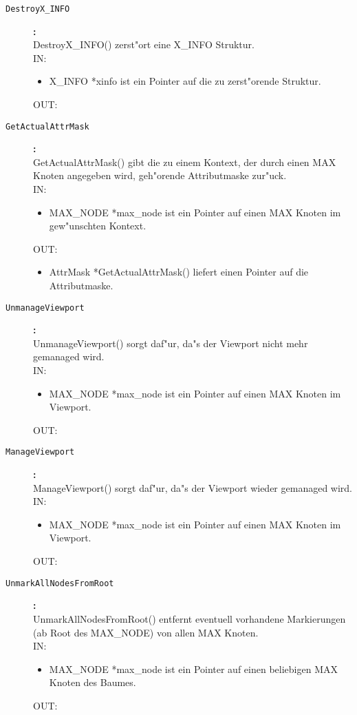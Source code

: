 \begin{description}
\item[\tt DestroyX\_INFO]{\bf :\\}
DestroyX\_INFO() zerst"ort eine X\_INFO Struktur. \\
IN:
\begin{itemize}
   \item X\_INFO *xinfo ist ein Pointer auf die zu zerst"orende Struktur.
\end{itemize}
OUT:

\item[\tt GetActualAttrMask]{\bf :\\}
GetActualAttrMask() gibt die zu einem Kontext, der durch einen MAX Knoten angegeben wird, geh"orende Attributmaske zur"uck. \\
IN:
\begin{itemize}
   \item MAX\_NODE *max\_node ist ein Pointer auf einen MAX Knoten im gew"unschten Kontext.
\end{itemize}
OUT:
\begin{itemize}
   \item AttrMask *GetActualAttrMask() liefert einen Pointer auf die Attributmaske.
\end{itemize}

\item[\tt UnmanageViewport]{\bf :\\}
UnmanageViewport() sorgt daf"ur, da"s der Viewport nicht mehr gemanaged wird. \\
IN:
\begin{itemize}
   \item MAX\_NODE *max\_node ist ein Pointer auf einen MAX Knoten im Viewport.
\end{itemize}
OUT:

\item[\tt ManageViewport]{\bf :\\}
ManageViewport() sorgt daf"ur, da"s der Viewport wieder gemanaged wird. \\
IN:
\begin{itemize}
   \item MAX\_NODE *max\_node ist ein Pointer auf einen MAX Knoten im Viewport.
\end{itemize}
OUT:

\item[\tt UnmarkAllNodesFromRoot]{\bf :\\}
UnmarkAllNodesFromRoot() entfernt eventuell vorhandene Markierungen (ab Root des MAX\_NODE) von allen MAX Knoten. \\
IN:
\begin{itemize}
   \item MAX\_NODE *max\_node ist ein Pointer auf einen beliebigen MAX Knoten des Baumes.
\end{itemize}
OUT:


\end{description}

